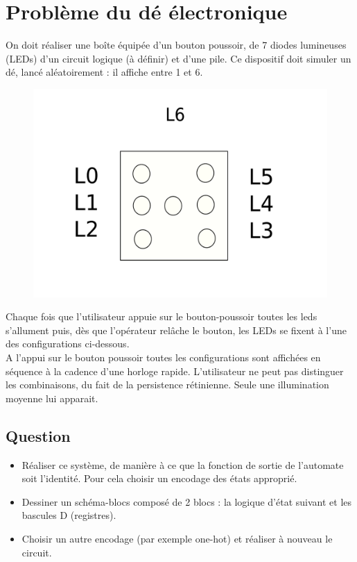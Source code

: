 \documentclass[a4paper,11pt]{article}
\begin{document}
\section{Problème du dé électronique}
On doit réaliser une boîte équipée d'un bouton poussoir, de 7 diodes lumineuses (LEDs) d'un circuit logique (à définir) et d'une pile. Ce dispositif doit simuler un dé,
lancé aléatoirement : il affiche entre 1 et 6.\\

\begin{figure}[!h]
\begin{center}
\includegraphics[scale=0.2]{./de-1.png}
\end{center}
\end{figure}


Chaque fois que l'utilisateur appuie sur le bouton-poussoir toutes les leds s'allument puis, dès que l'opérateur relâche le bouton,
les LEDs se fixent à l'une des configurations ci-dessous.\\

A l'appui sur le bouton poussoir toutes les configurations sont affichées en séquence à la cadence d'une horloge rapide. L'utilisateur ne peut
pas distinguer les combinaisons, du fait de la persistence rétinienne. Seule une illumination moyenne lui apparait.

\subsection*{Question}
\begin{itemize}
\item Réaliser ce système, de manière à ce que la fonction de sortie de l'automate soit l'identité. Pour cela choisir un encodage des états approprié.
\item Dessiner un schéma-blocs composé de 2 blocs : la logique d'état suivant et les bascules D (registres).
\item Choisir un autre encodage (par exemple one-hot) et réaliser à nouveau le circuit.
\end{itemize}
\end{document}
